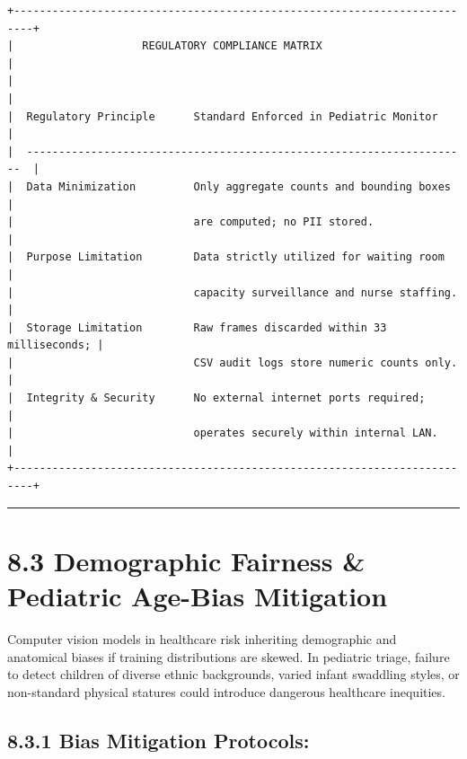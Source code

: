 \begin{verbatim}
+-------------------------------------------------------------------------+
|                    REGULATORY COMPLIANCE MATRIX                         |
|                                                                         |
|  Regulatory Principle      Standard Enforced in Pediatric Monitor       |
|  ---------------------------------------------------------------------  |
|  Data Minimization         Only aggregate counts and bounding boxes     |
|                            are computed; no PII stored.                 |
|  Purpose Limitation        Data strictly utilized for waiting room      |
|                            capacity surveillance and nurse staffing.    |
|  Storage Limitation        Raw frames discarded within 33 milliseconds; |
|                            CSV audit logs store numeric counts only.    |
|  Integrity & Security      No external internet ports required;         |
|                            operates securely within internal LAN.       |
+-------------------------------------------------------------------------+
\end{verbatim}

\begin{center}\rule{0.5\linewidth}{0.5pt}\end{center}

\section{8.3 Demographic Fairness \& Pediatric Age-Bias
Mitigation}\label{demographic-fairness-pediatric-age-bias-mitigation}

Computer vision models in healthcare risk inheriting demographic and
anatomical biases if training distributions are skewed. In pediatric
triage, failure to detect children of diverse ethnic backgrounds, varied
infant swaddling styles, or non-standard physical statures could
introduce dangerous healthcare inequities.

\subsection{8.3.1 Bias Mitigation
Protocols:}\label{bias-mitigation-protocols}

